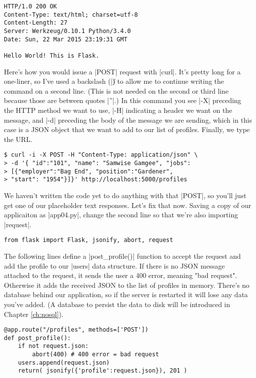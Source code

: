 \documentclass[11pt]{book}
\begin{document}
\begin{verbatim}
HTTP/1.0 200 OK
Content-Type: text/html; charset=utf-8
Content-Length: 27
Server: Werkzeug/0.10.1 Python/3.4.0
Date: Sun, 22 Mar 2015 23:19:31 GMT

Hello World! This is Flask.
\end{verbatim}

Here's how you would issue a |POST| request with |curl|.  It's pretty long for a one-liner, so I've used a backslash (|\|) to allow me to continue writing the command on a second line. (This is not needed on the second or third line because those are between quotes |''|.)  In this command you see |-X| preceding the HTTP method we want to use, |-H| indicating a header we want on the message, and |-d| preceding the body of the message we are sending, which in this case is a JSON object that we want to add to our list of profiles.  Finally, we type the URL.

\begin{verbatim}
$ curl -i -X POST -H "Content-Type: application/json" \
> -d '{ "id":"101", "name": "Samwise Gamgee", "jobs":
> [{"employer":"Bag End", "position":"Gardener",
> "start": "1954"}]}' http://localhost:5000/profiles
\end{verbatim}

We haven't written the code yet to do anything with that |POST|, so you'll just get one of our placeholder text responses.  Let's fix that now.  Saving a copy of our applicaiton as |app04.py|, change the second line so that we're also importing |request|.

\begin{verbatim}
from flask import Flask, jsonify, abort, request
\end{verbatim}

The following lines define a |post_profile()| function to accept the request and add the profile to our |users| data structure.  If there is no JSON message attached to the request, it sends the user a 400 error, meaning "bad request".  Otherwise it adds the received JSON to the list of profiles in memory.  There's no database behind our application, so if the server is restarted it will lose any data you've added.  (A database to persist the data to disk will be introduced in Chapter \ref{ch:nosql}).

\begin{verbatim}
@app.route("/profiles", methods=['POST'])
def post_profile():
    if not request.json:
        abort(400) # 400 error = bad request
    users.append(request.json)
    return( jsonify({'profile':request.json}), 201 )
\end{verbatim}
\end{document}

